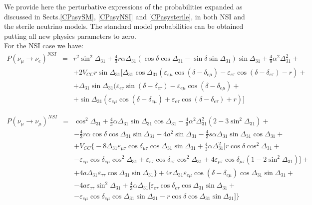 \documentclass[12pt]{article}
\begin{document}
We provide here the perturbative expressions of the probabilities expanded as discussed in Sects.\ref{CPasySM}, \ref{CPasyNSI} and \ref{CPasysterile}, in both NSI and the sterile neutrino models. The standard model probabilities can be obtained putting all new physics parameters to zero.\\
For the NSI case we have:
\begin{eqnarray}
\nonumber P(\nu_\mu\to\nu_e)^{NSI}&=& r^2\sin^2\Delta_{31}+\frac{4}{3}r\alpha\Delta_{31}(\cos\delta\cos\Delta_{31}-\sin\delta\sin\Delta_{31})\sin\Delta_{31}+\frac{4}{9}\alpha^2\Delta_{31}^2+\\
 \nonumber& &+2V_{CC}r\sin\Delta_{31}[\Delta_{31}\cos\Delta_{31}(\varepsilon_{e\mu}\cos(\delta-\delta_{e\mu})-\varepsilon_{e\tau}\cos(\delta-\delta_{e\tau})-r)+
 \\ \nonumber& & +\Delta_{31}\sin\Delta_{31}(\varepsilon_{e\tau}\sin(\delta-\delta_{e\tau})-\varepsilon_{e\mu}\cos(\delta-\delta_{e\mu})+\\
 & & +\sin\Delta_{31}(\varepsilon_{e\mu}\cos(\delta-\delta_{e\mu})+\varepsilon_{e\tau}\cos(\delta-\delta_{e\tau})+r)]
\end{eqnarray}



\begin{eqnarray}
 \nonumber P(\nu_\mu\to\nu_\mu)^{NSI}&=&\cos^2\Delta_{31}+\frac{4}{3} \alpha \Delta_{31}\sin\Delta_{31}\cos\Delta_{31}-\frac{4}{9}\alpha^2\Delta_{31}^2(2-3\sin^2\Delta_{31})+\\
\nonumber & &-\frac{4}{3}r\alpha \cos\delta\cos\Delta_{31}\sin\Delta_{31}+4a^2\sin\Delta_{31}-\frac{4}{3}s\alpha\Delta_{31}\sin\Delta_{31}\cos\Delta_{31}+ \\
 \nonumber & & +V_{CC}\bigg\{-8\Delta_{31}\varepsilon_{\mu\tau}\cos\delta_{\mu\tau}\cos\Delta_{31}\sin\Delta_{31}+\frac{4}{3} \alpha\Delta_{31}^2[ r\cos\delta\cos^2\Delta_{31}+\\
 \nonumber & & -\varepsilon_{e\mu}\cos\delta_{e\mu}\cos^2\Delta_{31}+\varepsilon_{e\tau}\cos\delta_{e\tau}\cos^2\Delta_{31}+4\varepsilon_{\mu\tau}\cos\delta_{\mu\tau}(1-2\sin^2\Delta_{31})]+\\
 \nonumber& &+4a\Delta_{31}\varepsilon_{\tau\tau}\cos\Delta_31\sin\Delta_{31}\}+4r\Delta_{31}\varepsilon_{e\mu}\cos(\delta-\delta_{e\mu})\cos\Delta_{31}\sin\Delta_{31}+\\
 \nonumber& &-4a\varepsilon_{\tau\tau}\sin^2\Delta_{31}+\frac{4}{3}\alpha\Delta_{31}[\varepsilon_{e\tau}\cos\delta_{e\tau}\cos\Delta_{31}\sin\Delta_{31}+\\
 & &-\varepsilon_{e\mu}\cos\delta_{e\mu}\cos\Delta_{31}\sin\Delta_{31}-r\cos\delta\cos\Delta_{31}\sin\Delta_{31}]\bigg\}
\end{eqnarray}
\end{document}
